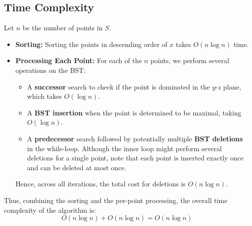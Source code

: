 \documentclass[a4paper]{article}
\begin{document}
\subsection*{Time Complexity}

Let \( n \) be the number of points in \( S \).

\begin{itemize}
    \item \textbf{Sorting:} Sorting the points in descending order of \( x \) takes \( O(n \log n) \) time.
    \item \textbf{Processing Each Point:} For each of the \( n \) points, we perform several operations on the BST:
    \begin{itemize}
        \item A \textbf{successor} search to check if the point is dominated in the \( y \)-\( z \) plane, which takes \( O(\log n) \).
        \item A \textbf{BST insertion} when the point is determined to be maximal, taking \( O(\log n) \).
        \item A \textbf{predecessor} search followed by potentially multiple \textbf{BST deletions} in the while-loop. Although the inner loop might perform several deletions for a single point, note that each point is inserted exactly once and can be deleted at most once.
    \end{itemize}
    Hence, across all iterations, the total cost for deletions is \( O(n \log n) \).
\end{itemize}

\noindent Thus, combining the sorting and the per-point processing, the overall time complexity of the algorithm is:
\[
O(n \log n) + O(n \log n) = O(n \log n)
\]
\end{document}

